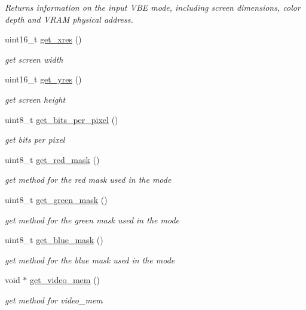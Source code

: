 \begin{DoxyCompactItemize}
\begin{DoxyCompactList}\small\item\em Returns information on the input V\+BE mode, including screen dimensions, color depth and V\+R\+AM physical address. \end{DoxyCompactList}\item 
uint16\+\_\+t \hyperlink{group__Video_ga3dcf2045f1929eb3b370b96715863c4e}{get\+\_\+xres} ()
\begin{DoxyCompactList}\small\item\em get screen width \end{DoxyCompactList}\item 
uint16\+\_\+t \hyperlink{group__Video_gad20679e2730425e7d0283793bdd6e696}{get\+\_\+yres} ()
\begin{DoxyCompactList}\small\item\em get screen height \end{DoxyCompactList}\item 
uint8\+\_\+t \hyperlink{group__Video_ga29911e110d87d372e97e0676d2768c95}{get\+\_\+bits\+\_\+per\+\_\+pixel} ()
\begin{DoxyCompactList}\small\item\em get bits per pixel \end{DoxyCompactList}\item 
uint8\+\_\+t \hyperlink{group__Video_ga98dfb26e764e6a19e51c2c6db282f982}{get\+\_\+red\+\_\+mask} ()
\begin{DoxyCompactList}\small\item\em get method for the red mask used in the mode \end{DoxyCompactList}\item 
uint8\+\_\+t \hyperlink{group__Video_gab8c921f22eb318361b6fe018e1759267}{get\+\_\+green\+\_\+mask} ()
\begin{DoxyCompactList}\small\item\em get method for the green mask used in the mode \end{DoxyCompactList}\item 
uint8\+\_\+t \hyperlink{group__Video_ga653e6120b1631cc1c2c3e0dd7d1a2917}{get\+\_\+blue\+\_\+mask} ()
\begin{DoxyCompactList}\small\item\em get method for the blue mask used in the mode \end{DoxyCompactList}\item 
void $\ast$ \hyperlink{group__Video_ga1d04069f4e8b1556a7a1ed2cd95bfdea}{get\+\_\+video\+\_\+mem} ()
\begin{DoxyCompactList}\small\item\em get method for video\+\_\+mem \end{DoxyCompactList}\item 

\end{DoxyCompactItemize}

